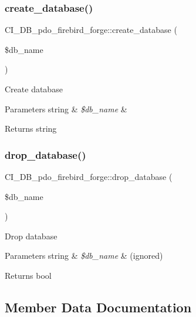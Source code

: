 \subsubsection{\texorpdfstring{create\+\_\+database()}{create\_database()}}
{\footnotesize\ttfamily C\+I\+\_\+\+D\+B\+\_\+pdo\+\_\+firebird\+\_\+forge\+::create\+\_\+database (\begin{DoxyParamCaption}\item[{}]{\$db\+\_\+name }\end{DoxyParamCaption})}

Create database


\begin{DoxyParams}[1]{Parameters}
string & {\em \$db\+\_\+name} & \\
\hline
\end{DoxyParams}
\begin{DoxyReturn}{Returns}
string 
\end{DoxyReturn}
\mbox{\label{class_c_i___d_b__pdo__firebird__forge_a6481e8231789cb2d81f24b6599c8181f}} 
\subsubsection{\texorpdfstring{drop\+\_\+database()}{drop\_database()}}
{\footnotesize\ttfamily C\+I\+\_\+\+D\+B\+\_\+pdo\+\_\+firebird\+\_\+forge\+::drop\+\_\+database (\begin{DoxyParamCaption}\item[{}]{\$db\+\_\+name }\end{DoxyParamCaption})}

Drop database


\begin{DoxyParams}[1]{Parameters}
string & {\em \$db\+\_\+name} & (ignored) \\
\hline
\end{DoxyParams}
\begin{DoxyReturn}{Returns}
bool 
\end{DoxyReturn}


\subsection{Member Data Documentation}
\mbox{\label{class_c_i___d_b__pdo__firebird__forge_a849f63d5b234603655b6d34bc45fcc04}} 
